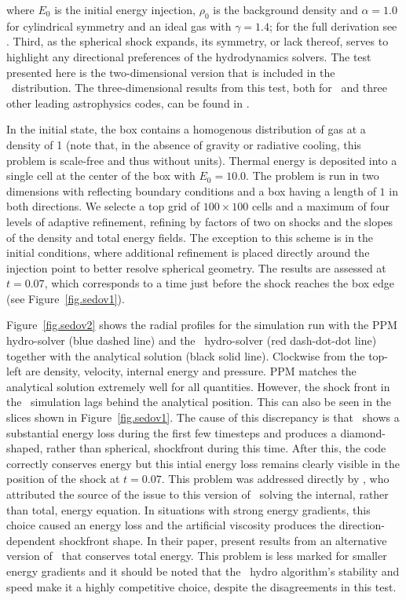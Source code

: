 \noindent where $E_0$ is the initial energy injection, $\rho_0$ is the
background density and $\alpha = 1.0$ for cylindrical symmetry and an
ideal gas with $\gamma = 1.4$; for the full derivation see
\citet{Sedov1959}.  Third, as the spherical shock expands, its
symmetry, or lack thereof, serves to highlight any directional
preferences of the hydrodynamics solvers.  The test presented here is
the two-dimensional version that is included in the \enzo\
distribution. The three-dimensional results from this test, both for
\enzo\ and three other leading astrophysics codes, can be found in
\citet{Tasker2008}.

In the initial state, the box contains a homogenous distribution of
gas at a density of 1 (note that, in the absence of gravity or
radiative cooling, this problem is scale-free and thus without
units). Thermal energy is deposited into a single cell at the center
of the box with $E_0 = 10.0$. The problem is run in two dimensions
with reflecting boundary conditions and a box having a length of $1$
in both directions.  We selecte a top grid of $100 \times 100$ cells
and a maximum of four levels of adaptive refinement, refining by
factors of two on shocks and the slopes of the density and total
energy fields. The exception to this scheme is in the initial
conditions, where additional refinement is placed directly around the
injection point to better resolve spherical geometry. The results are
assessed at $t = 0.07$, which corresponds to a time just before the
shock reaches the box edge (see Figure~\ref{fig.sedov1}).

Figure~\ref{fig.sedov2} shows the radial profiles for the simulation
run with the PPM hydro-solver (blue dashed line) and the \zeus\
hydro-solver (red dash-dot-dot line) together with the analytical
solution (black solid line). Clockwise from the top-left are density,
velocity, internal energy and pressure. PPM matches the analytical
solution extremely well for all quantities. However, the shock front
in the \zeus\ simulation lags behind the analytical position. This can
also be seen in the slices shown in Figure~\ref{fig.sedov1}. The cause
of this discrepancy is that \zeus\ shows a substantial energy loss
during the first few timesteps and produces a diamond-shaped, rather
than spherical, shockfront during this time. After this, the code
correctly conserves energy but this intial energy loss remains clearly
visible in the position of the shock at $t = 0.07$. This problem was
addressed directly by \citet{Clarke2010}, who attributed the source of
the issue to this version of \zeus\ solving the internal, rather than
total, energy equation. In situations with strong energy gradients,
this choice caused an energy loss and the artificial viscosity
produces the direction-dependent shockfront shape. In their paper,
\citet{Clarke2010} present results from an alternative version of
\zeus\ that conserves total energy. This problem is less marked for
smaller energy gradients and it should be noted that the \zeus\ hydro
algorithm's stability and speed make it a highly competitive choice,
despite the disagreements in this test.
